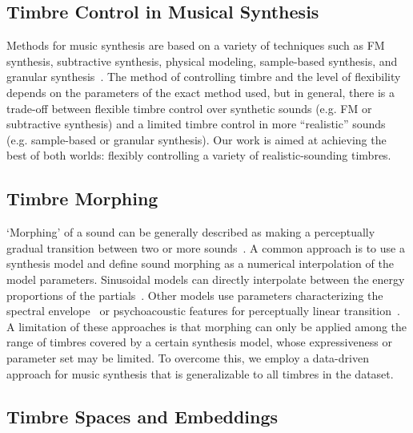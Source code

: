 
\subsection{Timbre Control in Musical Synthesis}

Methods for music synthesis are based on a variety of techniques such as FM synthesis, subtractive synthesis, physical modeling, sample-based synthesis, and granular synthesis~\cite{pejrolo2017creating}.
The method of controlling timbre and the level of flexibility depends on the parameters of the exact method used, but in general, there is a trade-off between flexible timbre control over synthetic sounds (e.g. FM or subtractive synthesis) and a limited timbre control in more ``realistic'' sounds (e.g. sample-based or granular synthesis). %
Our work is aimed at achieving the best of both worlds: flexibly controlling a variety of realistic-sounding timbres.

\pagebreak

\subsection{Timbre Morphing}

`Morphing' of a sound can be generally described as making a perceptually gradual transition between two or more sounds~\cite{caetano2010morph}.
A common approach is to use a synthesis model and define sound morphing as a numerical interpolation of the model parameters.
Sinusoidal models can directly interpolate between the energy proportions of the partials~\cite{osaka1995timbre,boccardi2001sound}.
Other models use parameters characterizing the spectral envelope~\cite{slaney1996automatic,ezzat2005morphing} or psychoacoustic features for perceptually linear transition~\cite{caetano2013musical}.
A limitation of these approaches is that morphing can only be applied among the range of timbres covered by a certain synthesis model, whose expressiveness or parameter set may be limited.
To overcome this, we employ a data-driven approach for music synthesis that is generalizable to all timbres in the dataset.

\subsection{Timbre Spaces and Embeddings}

